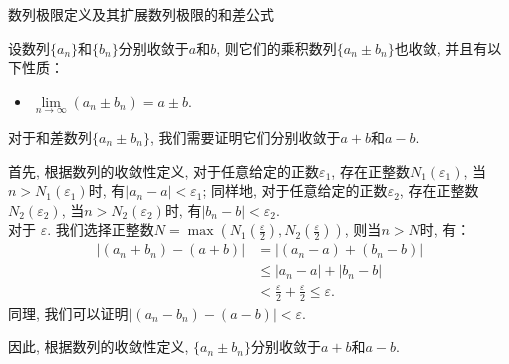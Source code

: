 \documentclass[
10pt,
aspectratio=43,
]{beamer}
\begin{document}
\begin{frame}{数列极限定义及其扩展}{数列极限的和差公式}
    {\small
        \begin{block}{}
            设数列$\{a_n\}$和$\{b_n\}$分别收敛于$a$和$b$, 则它们的乘积数列$\{a_n\pm b_n\}$也收敛, 并且有以下性质：
            \begin{itemize}
                \item $\lim\limits_{n \to \infty}(a_n \pm b_n) = a \pm b$.
            \end{itemize}
        \end{block}
        \pause
        \begin{exampleblock}{}
            对于和差数列$\{a_n \pm b_n\}$, 我们需要证明它们分别收敛于$a + b$和$a - b$.

            首先, 根据数列的收敛性定义, 对于任意给定的正数$\varepsilon_1$, 存在正整数$N_1(\varepsilon_1)$, 当$n > N_1(\varepsilon_1)$时, 有$|a_n - a| < \varepsilon_1$; 同样地, 对于任意给定的正数$\varepsilon_2$, 存在正整数$N_2(\varepsilon_2)$, 当$n > N_2(\varepsilon_2)$时, 有$|b_n - b| < \varepsilon_2$.\\
            \vspace{0.2cm}
            对于 $\varepsilon$. 我们选择正整数$N = \max(N_1(\frac{\varepsilon}{2}), N_2(\frac{\varepsilon}{2}))$, 则当$n > N$时, 有：
            \begin{align*}
                |(a_n + b_n) - (a + b)| & = |(a_n - a) + (b_n - b)|                                              \\
                                        & \leq |a_n - a| + |b_n - b|                                             \\
                                        & < \frac{\varepsilon}{2} + \frac{\varepsilon}{2} \leqslant \varepsilon.
            \end{align*}
            同理, 我们可以证明$|(a_n - b_n) - (a - b)| < \varepsilon$.

            因此, 根据数列的收敛性定义, $\{a_n \pm b_n\}$分别收敛于$a + b$和$a - b$.
        \end{exampleblock}
    }
\end{frame}
\end{document}
